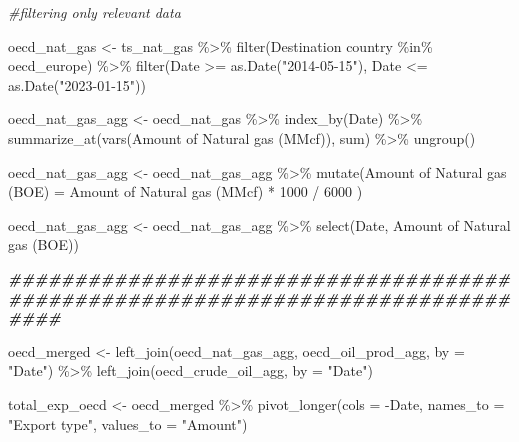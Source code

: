 \documentclass[
]{article}
\newenvironment{Shaded}{\begin{snugshade}}{\end{snugshade}}
\newcommand{\AttributeTok}[1]{\textcolor[rgb]{0.77,0.63,0.00}{#1}}
\newcommand{\CommentTok}[1]{\textcolor[rgb]{0.56,0.35,0.01}{\textit{#1}}}
\newcommand{\DecValTok}[1]{\textcolor[rgb]{0.00,0.00,0.81}{#1}}
\newcommand{\DocumentationTok}[1]{\textcolor[rgb]{0.56,0.35,0.01}{\textbf{\textit{#1}}}}
\newcommand{\FunctionTok}[1]{\textcolor[rgb]{0.00,0.00,0.00}{#1}}
\newcommand{\NormalTok}[1]{#1}
\newcommand{\OtherTok}[1]{\textcolor[rgb]{0.56,0.35,0.01}{#1}}
\newcommand{\SpecialCharTok}[1]{\textcolor[rgb]{0.00,0.00,0.00}{#1}}
\newcommand{\StringTok}[1]{\textcolor[rgb]{0.31,0.60,0.02}{#1}}
\begin{document}
\begin{Shaded}
\begin{Highlighting}[]
\CommentTok{\#filtering only relevant data}

\NormalTok{oecd\_nat\_gas }\OtherTok{\textless{}{-}}\NormalTok{ ts\_nat\_gas }\SpecialCharTok{\%\textgreater{}\%}
  \FunctionTok{filter}\NormalTok{(}\StringTok{\textasciigrave{}}\AttributeTok{Destination country}\StringTok{\textasciigrave{}} \SpecialCharTok{\%in\%}\NormalTok{ oecd\_europe) }\SpecialCharTok{\%\textgreater{}\%} 
  \FunctionTok{filter}\NormalTok{(Date }\SpecialCharTok{\textgreater{}=} \FunctionTok{as.Date}\NormalTok{(}\StringTok{"2014{-}05{-}15"}\NormalTok{), Date }\SpecialCharTok{\textless{}=} \FunctionTok{as.Date}\NormalTok{(}\StringTok{"2023{-}01{-}15"}\NormalTok{))}

\NormalTok{oecd\_nat\_gas\_agg }\OtherTok{\textless{}{-}}\NormalTok{ oecd\_nat\_gas }\SpecialCharTok{\%\textgreater{}\%}
  \FunctionTok{index\_by}\NormalTok{(Date) }\SpecialCharTok{\%\textgreater{}\%}
  \FunctionTok{summarize\_at}\NormalTok{(}\FunctionTok{vars}\NormalTok{(}\StringTok{\textasciigrave{}}\AttributeTok{Amount of Natural gas (MMcf)}\StringTok{\textasciigrave{}}\NormalTok{), sum) }\SpecialCharTok{\%\textgreater{}\%}
  \FunctionTok{ungroup}\NormalTok{()}

\NormalTok{oecd\_nat\_gas\_agg }\OtherTok{\textless{}{-}}\NormalTok{ oecd\_nat\_gas\_agg }\SpecialCharTok{\%\textgreater{}\%} 
  \FunctionTok{mutate}\NormalTok{(}\StringTok{\textasciigrave{}}\AttributeTok{Amount of Natural gas (BOE)}\StringTok{\textasciigrave{}} \OtherTok{=} \StringTok{\textasciigrave{}}\AttributeTok{Amount of Natural gas (MMcf)}\StringTok{\textasciigrave{}} \SpecialCharTok{*} \DecValTok{1000} \SpecialCharTok{/} \DecValTok{6000}\NormalTok{ )}

\NormalTok{oecd\_nat\_gas\_agg }\OtherTok{\textless{}{-}}\NormalTok{ oecd\_nat\_gas\_agg }\SpecialCharTok{\%\textgreater{}\%} 
  \FunctionTok{select}\NormalTok{(Date, }\StringTok{\textasciigrave{}}\AttributeTok{Amount of Natural gas (BOE)}\StringTok{\textasciigrave{}}\NormalTok{)}

\DocumentationTok{\#\#\#\#\#\#\#\#\#\#\#\#\#\#\#\#\#\#\#\#\#\#\#\#\#\#\#\#\#\#\#\#\#\#\#\#\#\#\#\#\#\#\#\#\#\#\#\#\#\#\#\#\#\#\#\#\#\#\#\#\#\#\#\#\#\#\#\#\#\#\#\#\#\#\#\#\#\#\#\#}

\NormalTok{oecd\_merged }\OtherTok{\textless{}{-}} \FunctionTok{left\_join}\NormalTok{(oecd\_nat\_gas\_agg, oecd\_oil\_prod\_agg, }\AttributeTok{by =} \StringTok{"Date"}\NormalTok{) }\SpecialCharTok{\%\textgreater{}\%}
  \FunctionTok{left\_join}\NormalTok{(oecd\_crude\_oil\_agg, }\AttributeTok{by =} \StringTok{"Date"}\NormalTok{)}

\NormalTok{total\_exp\_oecd }\OtherTok{\textless{}{-}}\NormalTok{ oecd\_merged }\SpecialCharTok{\%\textgreater{}\%}
  \FunctionTok{pivot\_longer}\NormalTok{(}\AttributeTok{cols =} \SpecialCharTok{{-}}\NormalTok{Date, }\AttributeTok{names\_to =} \StringTok{"Export type"}\NormalTok{, }\AttributeTok{values\_to =} \StringTok{"Amount"}\NormalTok{)}
\end{Highlighting}
\end{Shaded}
\end{document}

